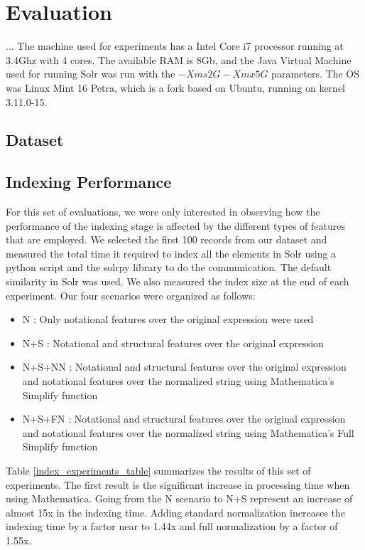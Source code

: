 \chapter{Evaluation}
...
The machine used for experiments has a Intel Core i7 processor running at 3.4Ghz with 4 cores. The available RAM is 8Gb, and the Java Virtual Machine used for running Solr was run with the $-Xms2G -Xmx5G$ parameters. The OS was Linux Mint 16 Petra, which is a fork based on Ubuntu, running on kernel 3.11.0-15.

\section{Dataset}

\section{Indexing Performance}
For this set of evaluations, we were only interested in observing how the performance of the indexing stage is affected by the different types of features that are employed. We selected the first 100 records from our dataset and measured the total time it required to index all the elements in Solr using a python script and the solrpy library to do the communication. The default similarity in Solr was used. We also measured the index size at the end of each experiment.
Our four scenarios were organized as follows:
\begin{itemize}
\item N : Only notational features over the original expression were used
\item N+S : Notational and structural features over the original expression
\item N+S+NN : Notational and structural features over the original expression and notational features over the normalized string using Mathematica's Simplify function
\item N+S+FN : Notational and structural features over the original expression and notational features over the normalized string using Mathematica's Full Simplify function
\end{itemize}

Table \ref{index_experiments_table} summarizes the results of this set of experiments. The first result is the significant increase in processing time when using Mathematica. Going from the N scenario to N+S represent an increase of almost 15x in the indexing time. Adding standard normalization increases the indexing time by a factor near to 1.44x and full normalization by a factor of 1.55x.

